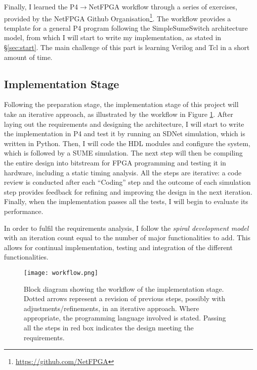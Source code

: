 Finally, I learned the P4$\rightarrow$NetFPGA workflow through a series of exercises, provided by the NetFPGA Github Organisation\footnote{\url{https://github.com/NetFPGA}}. The workflow provides a template for a general P4 program following the SimpleSumeSwitch architecture model, from which I will start to write my implementation, as stated in \S\ref{sec:start}. The main challenge of this part is learning Verilog and Tcl in a short amount of time.

\subsection{Implementation Stage}
Following the preparation stage, the implementation stage of this project will take an iterative approach, as illustrated by the workflow in Figure \ref{fig:workflow}. After laying out the requirements and designing the architecture, I will start to write the implementation in P4 and test it by running an SDNet simulation, which is written in Python. Then, I will code the HDL modules and configure the system, which is followed by a SUME simulation. The next step will then be compiling the entire design into bitstream for FPGA programming and testing it in hardware, including a static timing analysis. All the steps are iterative: a code review is conducted after each ``Coding'' step and the outcome of each simulation step provides feedback for refining and improving the design in the next iteration. Finally, when the implementation passes all the tests, I will begin to evaluate its performance.

In order to fulfil the requirements analysis, I follow the \textit{spiral development model} \cite{spiral} with an iteration count equal to the number of major functionalities to add. This allows for continual implementation, testing and integration of the different functionalities.

\begin{figure}[!ht]
	\centering
	\texttt{[image: workflow.png]}
	\caption{Block diagram showing the workflow of the implementation stage. Dotted arrows represent a revision of previous steps, possibly with adjustments/refinements, in an iterative approach. Where appropriate, the programming language involved is stated. Passing all the steps in red box indicates the design meeting the requirements.}
	\label{fig:workflow}
\end{figure}

